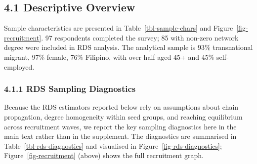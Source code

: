 \documentclass[
  12pt,
  letterpaper,
  DIV=11,
  numbers=noendperiod]{scrartcl}
\begin{document}
\subsection{4.1 Descriptive Overview}\label{sec-descriptive}

Sample characteristics are presented in Table~\ref{tbl-sample-chars} and
Figure~\ref{fig-recruitment}. 97 respondents completed the survey; 85
with non-zero network degree were included in RDS analysis. The
analytical sample is 93\% transnational migrant, 97\% female, 76\%
Filipino, with over half aged 45+ and 45\% self-employed.

\subsubsection{4.1.1 RDS Sampling
Diagnostics}\label{sec-rds-diagnostics}

Because the RDS estimators reported below rely on assumptions about
chain propagation, degree homogeneity within seed groups, and reaching
equilibrium across recruitment waves, we report the key sampling
diagnostics here in the main text rather than in the supplement. The
diagnostics are summarised in Table~\ref{tbl-rds-diagnostics} and
visualised in Figure~\ref{fig-rds-diagnostics};
Figure~\ref{fig-recruitment} (above) shows the full recruitment graph.
\end{document}
